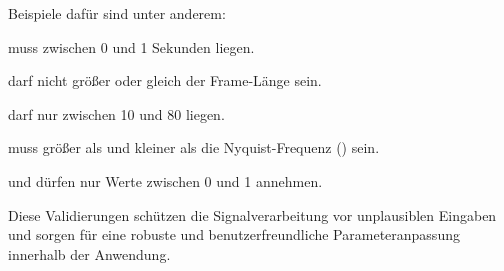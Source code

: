 Beispiele dafür sind unter anderem: 

 muss zwischen 0 und 1 Sekunden liegen. 

 darf nicht größer oder gleich der Frame-Länge sein. 

 darf nur zwischen 10 und 80 liegen. 

 muss größer als  und kleiner als die Nyquist-Frequenz () sein. 

 und  dürfen nur Werte zwischen 0 und 1 annehmen. 

Diese Validierungen schützen die Signalverarbeitung vor unplausiblen Eingaben und sorgen für eine robuste und benutzerfreundliche Parameteranpassung innerhalb der Anwendung. \cite{Hossain:2025} \cite{MathWorks:2025BigDataVideo} \cite{Pfister:2017} \cite{MathWorks:2025SignalToolbox}

